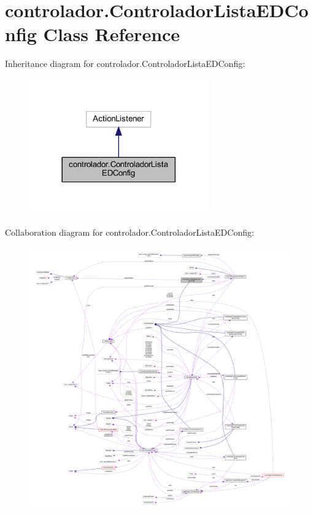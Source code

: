 \hypertarget{classcontrolador_1_1_controlador_lista_e_d_config}{}\section{controlador.\+Controlador\+Lista\+E\+D\+Config Class Reference}
\label{classcontrolador_1_1_controlador_lista_e_d_config}


Inheritance diagram for controlador.\+Controlador\+Lista\+E\+D\+Config\+:
\nopagebreak
\begin{figure}[H]
\begin{center}
\leavevmode
\includegraphics[width=218pt]{classcontrolador_1_1_controlador_lista_e_d_config__inherit__graph}
\end{center}
\end{figure}


Collaboration diagram for controlador.\+Controlador\+Lista\+E\+D\+Config\+:
\nopagebreak
\begin{figure}[H]
\begin{center}
\leavevmode
\includegraphics[width=350pt]{classcontrolador_1_1_controlador_lista_e_d_config__coll__graph}
\end{center}
\end{figure}
